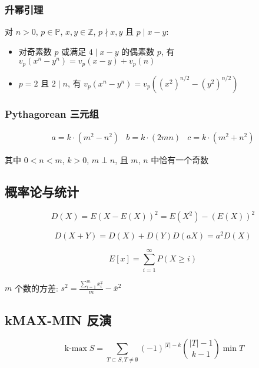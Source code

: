 \subsubsection{升幂引理}

对 \(n>0\), \(p\in\mathbb{P}\), \(x,y\in\mathbb{Z}\), \(p\nmid x,y\) 且 \(p\mid x-y\):

\begin{itemize}
    \item 对奇素数 \(p\) 或满足 \(4\mid x-y\) 的偶素数 \(p\), 有 \(v_p\left(x^n-y^n\right)=v_p(x-y)+v_p(n)\)
    \item \(p=2\) 且 \(2\mid n\), 有 \(v_p\left(x^n-y^n\right)=v_p\left(\left(x^2\right)^{n/2}-\left(y^2\right)^{n/2}\right)\)
\end{itemize}

\subsubsection{Pythagorean 三元组}

\[
    \begin{array}{ccc}
        a=k\cdot\left(m^2-n^2\right) & b=k\cdot\left(2mn\right) & c=k\cdot\left(m^2+n^2\right)
    \end{array}
\]

其中 \(0<n<m\), \(k>0\), \(m\perp n\), 且 \(m\), \(n\) 中恰有一个奇数

\subsection{概率论与统计}

\begin{equation}
    D(X)=E(X-E(X))^2=E\left(X^2\right)-(E(X))^2
\end{equation}

\begin{equation}
    D(X+Y)=D(X)+D(Y)D(aX)=a^2D(X)
\end{equation}

\begin{equation}
    E[x]=\sum_{i=1}^{\infty}P(X\geq i)
\end{equation}

\(m\) 个数的方差: \(\displaystyle s^2=\frac{\sum_{i=1}^m x_i^2}m-\overline x^2\)

\subsection{kMAX-MIN 反演}

\begin{equation}
    \operatorname{k-max} S=\sum_{T\subset S, T\neq \emptyset}(-1)^{|T|-k}\binom{|T|-1}{k-1}\min T
\end{equation}

